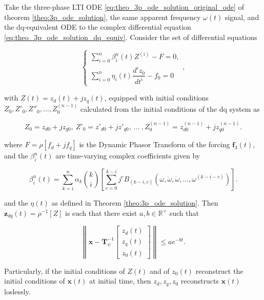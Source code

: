 \begin{theorem}\label{corollary:3p_complex_equivalence_phasorialodes} %

	Take the three-phase LTI ODE \eqref{eq:theo_3p_ode_solution_original_ode} of theorem \ref{theo:3p_ode_solution}, the same apparent frequency $\omega(t)$ signal, and the dq-equivalent ODE to the complex differential equation \eqref{eq:theo_3p_ode_solution_dq_equiv}. Consider the set of differential equations

\begin{equation}
\left\{\begin{array}{l}
	\displaystyle \sum\limits_{i=0}^n \beta_i^n(t) Z^{(i)} - F = 0 ,\\[5mm]
	\displaystyle \sum\limits_{i=0}^n \eta_i(t) \dfrac{d^i z_0}{dt^i} - f_0 = 0
\end{array}\right. , \label{eq:theo_3p_ode_solution_complex_equiv}
\end{equation}

	\noindent with $Z(t) = z_d(t) + jz_q(t)$, equipped with	initial conditions $Z_0,Z'_0,Z''_0,...,Z^{(n-1)}_0$ calculated from the initial conditions of the dq system as

\begin{equation} Z_0 = z_{d0} + jz_{q0},\ Z'_0 = z'_{d0} + jz'_{q0},\ ...\ ,Z^{(n-1)}_0 = z^{(n-1)}_{d0} + jz^{(n-1)}_{q0}. \end{equation}
	
	\noindent where $F = \rho\left[f_d + jf_q\right]$ is the Dynamic Phasor Transform of the forcing $\mathbf{f}_3(t)$, and the $\beta_i^n(t)$ are time-varying complex coefficients given by

\begin{equation} \beta_i^n(t) = \sum\limits_{k=i}^{n} \alpha_k{k\choose i} \left[\sum\limits_{c=0}^{k-i} j^cB_{\left(k-i,c\right)}\left(\omega,\dot{\omega},\ddot{\omega},...,\omega^{(k-i-c)}\right) \right].  \end{equation}

	\noindent and the $\eta(t)$ as defined in Theorem \ref{theo:3p_ode_solution}. Then $\mathbf{z}_{dq}(t) = \rho^{-1}\left[Z\right]$ is such that there exist $a,b\in\mathbb{R}^+$ such that

\begin{equation} \left\lVert \mathbf{x} - \mathbf{T}^{-1}_\psi\left[\begin{array}{c} z_d(t) \\[3mm] z_q(t) \\[3mm] z_0(t) \end{array}\right]\right\rVert \leq ae^{-bt}. \label{eq:theo_3p_ode_complex_solution_exp}\end{equation}

	Particularly, if the initial conditions of $Z(t)$ and of $z_0(t)$ reconstruct the initial conditions of $\mathbf{x}(t)$ at initial time, then $z_d,z_q,z_0$ reconstructs $\mathbf{x}(t)$ loslessly.
\end{theorem}
